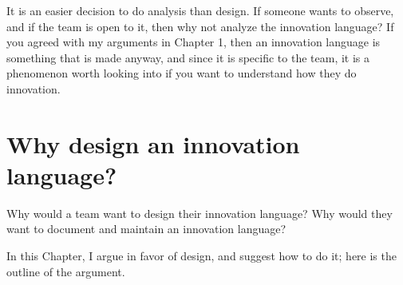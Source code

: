 It is an easier decision to do analysis than design. If someone wants to observe, and if the team is open to it, then why not analyze the innovation language? If you agreed with my arguments in Chapter 1, then an innovation language is something that is made anyway, and since it is specific to the team, it is a phenomenon worth looking into if you want to understand how they do innovation.

\section{Why design an innovation language?}
\label{c2:s3}
Why would a team want to design their innovation language? Why would they want to document and maintain an innovation language? 

In this Chapter, I argue in favor of design, and suggest how to do it; here is the outline of the argument.
